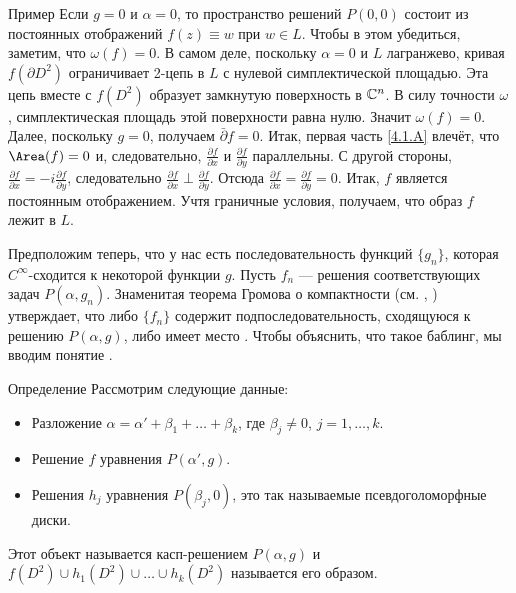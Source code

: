\begin{ex*}{Пример}
Если $g = 0$ и $\alpha = 0$, то пространство решений $P (0, 0)$ состоит из постоянных отображений $f (z) \equiv w$ при $w \in L$.
Чтобы в этом убедиться, заметим, что $\omega (f) = 0$.
В самом деле, поскольку $\alpha = 0$ и $L$ лагранжево, кривая $f (\partial D^2)$ ограничивает 2-цепь в $L$ с нулевой симплектической площадью.
Эта цепь вместе с $f (D^2)$ образует замкнутую поверхность в $\mathbb{C}^n$.
В силу точности $\omega$, симплектическая площадь этой поверхности равна нулю.
Значит $\omega (f) = 0$.
Далее, поскольку $g = 0$, получаем $\bar\partial f=0$.
Итак, первая часть \ref{4.1.A} влечёт, что $\Area (f) = 0$ и, следовательно, $\tfrac{\partial f}{\partial x}$ и $\tfrac{\partial f}{\partial y}$ параллельны.
С другой стороны, $\tfrac{\partial f}{\partial x}=-i\tfrac{\partial f}{\partial y}$,
следовательно $\tfrac{\partial f}{\partial x}\perp\tfrac{\partial f}{\partial y}$.
Отсюда $\tfrac{\partial f}{\partial x}=\tfrac{\partial f}{\partial y}=0$.
Итак, $f$ является постоянным отображением.
Учтя граничные условия, получаем, что образ $f$ лежит в $L$.
\end{ex*}

Предположим теперь, что у нас есть последовательность функций
$\{g_n\}$, которая $C^\infty$-сходится к некоторой функции $g$. 
Пусть $f_n$ --- решения соответствующих задач $P(\alpha, g_n)$.
Знаменитая теорема Громова о компактности (см. \cite{G1}, \cite{AL})
утверждает, что либо $\{f_n\}$ содержит подпоследовательность,
сходящуюся к решению $P (\alpha, g)$, либо имеет место
.
Чтобы объяснить, что такое баблинг, мы вводим понятие
. 

\begin{ex*}{Определение}
Рассмотрим следующие данные:
\begin{itemize}
\item Разложение $\alpha = \alpha' + \beta_1 +\dots + \beta_k$, где $\beta_j \ne 0$, $j = 1,\dots,k$.
\item Решение $f$ уравнения $P (\alpha', g)$.
\item Решения $h_j$ уравнения  $P (\beta_j, 0)$, это так называемые
  псевдоголоморфные диски. 
\end{itemize}
Этот объект называется касп-решением $P(\alpha,g)$ и 
$f(D^2)\cup h_1(D^2) \cup\dots\cup h_k (D^2)$ называется его образом.
\end{ex*}

